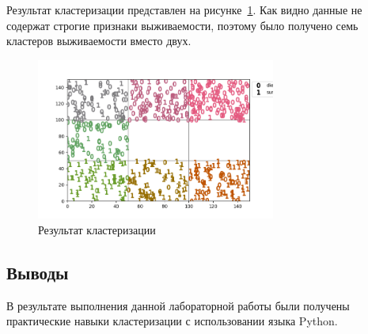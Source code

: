 Результат кластеризации представлен на рисунке~\ref{fig:result}. Как видно данные не содержат строгие признаки выживаемости, поэтому было получено семь кластеров выживаемости вместо двух.  

\begin{figure}[H]
    \centering
        \includegraphics[width=0.7\textwidth]{result}
    \caption{Результат кластеризации}
    \label{fig:result}
\end{figure} 

\subsection*{Выводы}
В результате выполнения данной лабораторной работы были получены практические навыки кластеризации с использовании языка Python.


